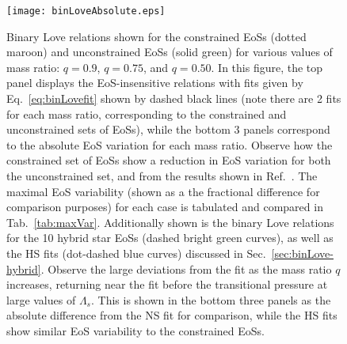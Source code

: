 \documentclass[prd,twocolumn,nofootinbib,superscriptaddress,amsmath,amssymb]{revtex4-1}
\begin{document}
{}
{}
\begin{figure}
\begin{center} 
\texttt{[image: binLoveAbsolute.eps]}%
\end{center}
\caption{
Binary Love relations shown for the constrained EoSs (dotted maroon) and unconstrained EoSs (solid green) for various values of mass ratio: $q=0.9$, $q=0.75$, and $q=0.50$.
In this figure, the top panel displays the EoS-insensitive relations with fits given by Eq.~\ref{eq:binLovefit} shown by dashed black lines (note there are 2 fits for each mass ratio, corresponding to the constrained and unconstrained sets of EoSs), while the bottom 3 panels correspond to the absolute EoS variation for each mass ratio.
Observe how the constrained set of EoSs show a reduction in EoS variation for both the unconstrained set, and from the results shown in Ref.~\cite{Yagi:binLove}.
The maximal EoS variability (shown as a the fractional difference for comparison purposes) for each case is tabulated and compared in Tab.~\ref{tab:maxVar}.
Additionally shown is the binary Love relations for the 10 hybrid star EoSs (dashed bright green curves), as well as the HS fits (dot-dashed blue curves) discussed in Sec.~\ref{sec:binLove-hybrid}.
Observe the large deviations from the fit as the mass ratio $q$ increases, returning near the fit before the transitional pressure at large values of $\Lambda_s$.
This is shown in the bottom three panels as the absolute difference from the NS fit for comparison, while the HS fits show similar EoS variability to the constrained EoSs.
}
\label{fig:binLove}
\end{figure} 
\end{document}
